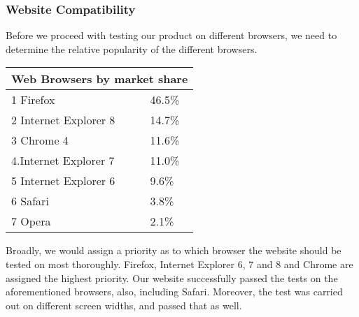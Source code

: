 \subsubsection{Website Compatibility}

Before we proceed with testing our product on different browsers, we need to determine the relative popularity of the different browsers.\footnotemark


\begin{tabular}{|l|l|}
\hline
\multicolumn{2}{|c|}{Web Browsers by market share} \\
\hline
1 Firefox & 46.5\% \\
2 Internet Explorer 8 & 14.7\% \\
3 Chrome 4 & 11.6\% \\
4.Internet Explorer 7 & 11.0\% \\
5 Internet Explorer 6 & 9.6\% \\
6 Safari & 3.8\% \\
7 Opera & 2.1\% \\
\hline
\end{tabular}
\newline{}
\newline{}

Broadly, we would assign a priority as to which browser the website should be tested on most thoroughly. Firefox, Internet Explorer 6, 7 and 8 and Chrome are assigned the highest priority. Our website successfully passed the tests on the aforementioned browsers, also, including Safari. Moreover, the test was carried out on different screen widths, and passed that as well.

